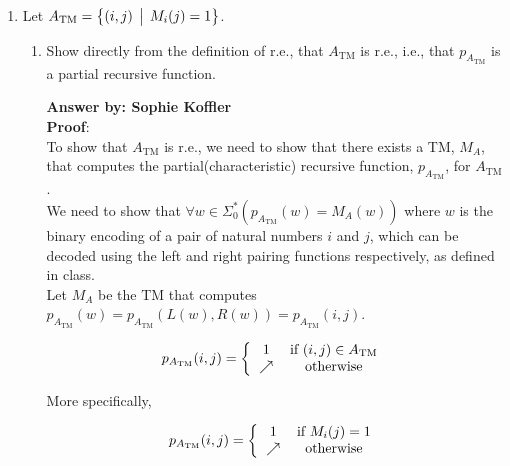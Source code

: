 \documentclass[12pt]{article}
\begin{document}
\thispagestyle{empty}
\noindent{}
\addtocounter{section}{2}

\begin{enumerate}
\item  Let $A_{\text{TM}} = \bigl\{ (i,j) \,\bigm|\, M_i(j) = 1 \bigr\}$.  

\begin{enumerate}
   \item Show directly from the definition of r.e., that $A_{\text{TM}}$ is r.e., i.e., that 
         $p_{A_{\text{TM}}}$ is a partial recursive function.  
       
{\bf Answer by: Sophie Koffler} \\
  
         \textbf{Proof}: 
         \\To show that $A_{\text{TM}}$ is r.e., we need to show that there exists a TM, $M_{A}$, that computes  the partial(characteristic) recursive function, $p_{A_{\text{TM}}}$, for $A_{\text{TM}}$. 
         \\We need to show that $\forall w \in \Sigma_{0}^{*} (p_{A_{\text{TM}}}(w) = M_{A}(w))$ where $w$ is the binary encoding of a pair of natural numbers $i$ and $j$, which can be decoded using the left and right pairing functions respectively, as defined in class.
         \\Let $M_{A}$ be the TM that computes $p_{A_{\text{TM}}}(w) = p_{A_{\text{TM}}}(L(w),R(w)) = p_{A_{\text{TM}}}(i,j)$.
		  \begin{center}	 
         \[ p_{A_{\text{TM}}}(i,j) = 
         \left \{
         \begin{tabular}{cc}
         1 & if $(i,j) \in A_{\text{TM}}$  \\
         $\nearrow$ & otherwise \\
         \end{tabular}
         \right.
         \]
	    \end{center}
          More specifically, 
         \begin{center}
          \[ p_{A_{\text{TM}}}(i,j) = 
          \left \{
          \begin{tabular}{cc}
          1 & if $M_{i}(j)=1$  \\
          $\nearrow$  & otherwise \\
          \end{tabular}
          \right.
          \]
        \end{center}
        

\end{enumerate}
\end{enumerate}
\end{document}
